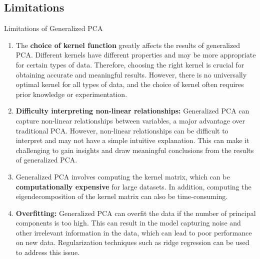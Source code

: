 \documentclass{beamer}
\begin{document}
\subsection{Limitations}
\begin{frame}[allowframebreaks]{Limitations of Generalized PCA}
    \begin{enumerate}
        \item The \textbf{choice of kernel function} greatly affects the results of generalized PCA. Different kernels have different properties and may be more appropriate for certain types of data. Therefore, choosing the right kernel is crucial for obtaining accurate and meaningful results. However, there is no universally optimal kernel for all types of data, and the choice of kernel often requires prior knowledge or experimentation.
        \item \textbf{Difficulty interpreting non-linear relationships:} Generalized PCA can capture non-linear relationships between variables, a major advantage over traditional PCA. However, non-linear relationships can be difficult to interpret and may not have a simple intuitive explanation. This can make it challenging to gain insights and draw meaningful conclusions from the results of generalized PCA.
        \item Generalized PCA involves computing the kernel matrix, which can be \textbf{computationally expensive} for large datasets. In addition, computing the eigendecomposition of the kernel matrix can also be time-consuming. 
        \item \textbf{Overfitting:} Generalized PCA can overfit the data if the number of principal components is too high. This can result in the model capturing noise and other irrelevant information in the data, which can lead to poor performance on new data. Regularization techniques such as ridge regression can be used to address this issue.
    \end{enumerate}
\end{frame}
\end{document}
